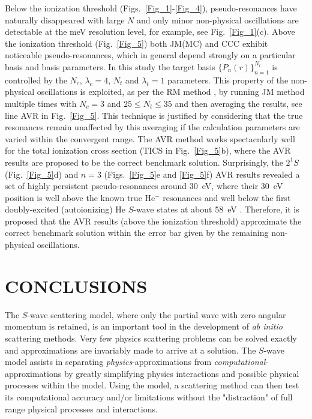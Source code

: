\documentclass[aip
, pra
, showpacs
, aps
, twocolumn
, groupedaddress
, floatfix
]{revtex4}
\begin{document}
Below the ionization threshold (Figs.~\ref{Fig_1}-\ref{Fig_4}), pseudo-resonances have naturally disappeared with large $N$
and only minor non-physical oscillations are detectable at the meV resolution level, for example, see Fig.~\ref{Fig_1}(c).
Above the ionization threshold (Fig.~\ref{Fig_5}) both JM(MC) and CCC exhibit noticeable pseudo-resonances,
which in general depend strongly on a particular basis and basis parameters.
In this study the target basis $\{P_n(r)\}_{n=1}^{N_t}$ is controlled by the $N_c$, $\lambda_c=4$, $N_t$ and $\lambda_t=1$ parameters.
This property of the non-physical oscillations is exploited, as per the RM method \cite{BB97},
by running JM method multiple times with $N_c=3$ and $25 \leq N_t\leq 35$ and then averaging
 the results, see line AVR in Fig.~\ref{Fig_5}.
This technique is justified by considering that the true resonances remain unaffected by this averaging if the calculation parameters are varied within the convergent range.
The AVR method works spectacularly well for the total ionization cross section (TICS in Fig.~\ref{Fig_5}b),
where the AVR results are proposed to be the correct benchmark solution.
Surprisingly, the $2^1S$ (Fig.~\ref{Fig_5}d) and $n=3$ (Figs.~\ref{Fig_5}e and \ref{Fig_5}f) AVR results revealed a set of highly persistent pseudo-resonances around 30~eV,
where their 30~eV position is well above the known true He$^-$ resonances \cite{BC94} and well below the first doubly-excited (autoionizing) He $S$-wave states at about 58~eV \cite{BS10p022715,EUO77}.
Therefore, it is proposed that the AVR results (above the ionization threshold) approximate the correct benchmark solution within the error bar given by the remaining non-physical oscillations.



\section{CONCLUSIONS}


The $S$-wave scattering model, where only the partial wave with zero angular momentum is retained,
is an important tool in the development of {\em ab initio} scattering methods.
Very few physics scattering problems can be solved exactly and approximations are invariably made to arrive at a solution.
The $S$-wave model assists in separating {\em physics}-approximations from {\em computational}-approximations by
greatly simplifying physics interactions and possible physical processes within the model.
Using the model, a scattering method can then test its computational accuracy
and/or limitations without the "distraction" of full range physical processes and interactions.
\end{document}
